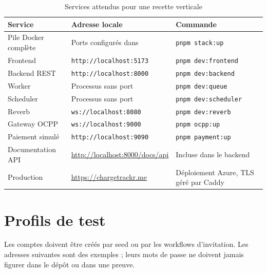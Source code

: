\begin{table}[H]
\centering
\caption{Services attendus pour une recette verticale}
\begin{tabularx}{\textwidth}{|L{3.2cm}|L{4.3cm}|Y|}
\hline
{}\textbf{Service} & \textbf{Adresse locale} & \textbf{Commande} \\ \hline
Pile Docker complète & Ports configurés dans  & \texttt{pnpm stack:up} \\ \hline
Frontend & \texttt{http://localhost:5173} & \texttt{pnpm dev:frontend} \\ \hline
Backend REST & \texttt{http://localhost:8000} & \texttt{pnpm dev:backend} \\ \hline
Worker & Processus sans port & \texttt{pnpm dev:queue} \\ \hline
Scheduler & Processus sans port & \texttt{pnpm dev:scheduler} \\ \hline
Reverb & \texttt{ws://localhost:8080} & \texttt{pnpm dev:reverb} \\ \hline
Gateway OCPP & \texttt{ws://localhost:9000} & \texttt{pnpm ocpp:up} \\ \hline
Paiement simulé & \texttt{http://localhost:9090} & \texttt{pnpm payment:up} \\ \hline
Documentation API & \url{http://localhost:8000/docs/api} & Incluse dans le backend \\ \hline
Production & \url{https://chargetrackr.me} & Déploiement Azure, TLS géré par Caddy \\ \hline
\end{tabularx}
\end{table}

\section{Profils de test}

Les comptes doivent être créés par seed ou par les workflows d'invitation. Les
adresses suivantes sont des exemples ; leurs mots de passe ne doivent jamais
figurer dans le dépôt ou dans une preuve.

